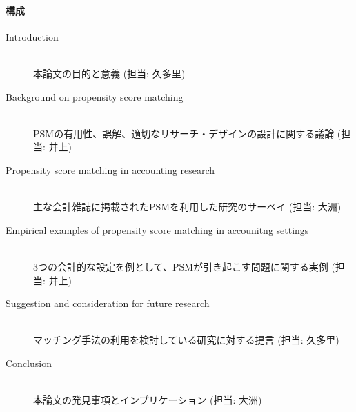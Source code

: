 \paragraph{構成}
\begin{description}
 \item[Introduction] \mbox{}\\
            本論文の目的と意義 (担当: 久多里)
 \item[Background on propensity score matching] \mbox{}\\
            PSMの有用性、誤解、適切なリサーチ・デザインの設計に関する議論 (担当: 井上)
 \item[Propensity score matching in accounting research] \mbox{}\\
            主な会計雑誌に掲載されたPSMを利用した研究のサーベイ (担当: 大洲)
 \item[Empirical examples of propensity score matching in accounitng settings] \mbox{}\\
            3つの会計的な設定を例として、PSMが引き起こす問題に関する実例 (担当: 井上)
 \item[Suggestion and consideration for future research] \mbox{}\\
            マッチング手法の利用を検討している研究に対する提言  (担当: 久多里)
 \item[Conclusion] \mbox{}\\
            本論文の発見事項とインプリケーション  (担当: 大洲)
\end{description}




